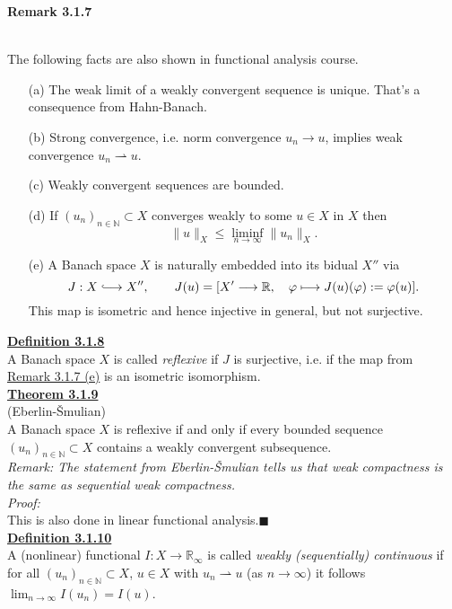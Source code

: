 \hypertarget{remark_3_1_7}{\textbf{Remark 3.1.7}}\\
The following facts are also shown in functional analysis course.
\begin{itemize}
	\item[(a)] The weak limit of a weakly convergent sequence is unique. That's a consequence from Hahn-Banach.
	\item[(b)] Strong convergence, i.e. norm convergence $u_n\to u$, implies weak convergence $u_n\rightharpoonup u$.
	\item[(c)] Weakly convergent sequences are bounded.
	\item[(d)] If $(u_n)_{n\in\mathbb{N}}\subset X$ converges weakly to some $u\in X$ in $X$ then
	\[\lVert u\rVert_X\leq\liminf_{n\to\infty}{\lVert u_n\rVert_X}.\]
	\item[(e)] A Banach space $X$ is naturally embedded into its bidual $X''$ via
	\[J:X\longhookrightarrow X'',\qquad J(u)=[X'\longrightarrow\mathbb{R},\quad\varphi\longmapsto J(u)(\varphi):=\varphi(u)].\]
	This map is isometric and hence injective in general, but not surjective.\\[11pt]
\end{itemize}

\textbf{\underline{Definition 3.1.8}}\\
A Banach space $X$ is called \textit{reflexive} if $J$ is surjective, i.e. if the map from \hyperlink{remark_3_1_7}{Remark 3.1.7 (e)} is an isometric isomorphism.\\[11pt]

\hypertarget{theorem_3_1_9}{\textbf{\underline{Theorem 3.1.9}}}\\
(Eberlin-\v{S}mulian)\\
A Banach space $X$ is reflexive if and only if every bounded sequence $(u_n)_{n\in\mathbb{N}}\subset X$ contains a weakly convergent subsequence.\\

\textit{Remark: The statement from Eberlin-\v{S}mulian tells us that weak compactness is the same as sequential weak compactness.}\\

\textit{Proof:}\\
This is also done in linear functional analysis.\hfill$\blacksquare$\\[11pt]

\textbf{\underline{Definition 3.1.10}}\\
A (nonlinear) functional $I:X\longrightarrow\mathbb{R}_\infty$ is called \textit{weakly (sequentially) continuous} if for all $(u_n)_{n\in\mathbb{N}}\subset X$, $u\in X$ with $u_n\rightharpoonup u$ (as $n\to\infty$) it follows $\lim_{n\to\infty}{I(u_n)}=I(u)$.\\[11pt]

